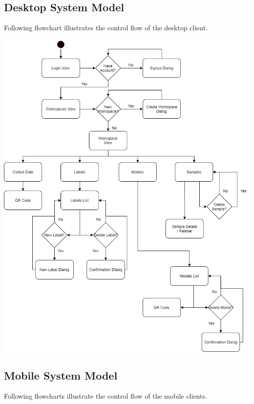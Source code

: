 \newpage
\subsection{Desktop System Model}
Following flowchart illustrates the control flow of the desktop client. 
\begin{center}
    \includegraphics[width=\textwidth,height=0.85\textheight,keepaspectratio]{charts/flow1.png}
\end{center}

\newpage

\subsection{Mobile System Model}
Following flowcharts illustrate the control flow of the mobile clients. 
\vspace{1cm}

